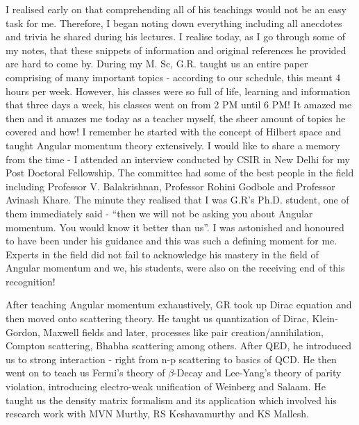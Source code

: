I realised early on that comprehending all of his teachings would not be an easy task
for me. Therefore, I began noting down everything including all anecdotes and trivia he
shared during his lectures. I realise today, as I go through some of my notes, that these
snippets of information and original references he provided are hard to come by.
During my M. Sc, G.R. taught us an entire paper comprising of many important topics
- according to our schedule, this meant 4 hours per week. However, his classes were so
full of life, learning and information that three days a week, his classes went on from 2
PM until 6 PM! It amazed me then and it amazes me today as a teacher myself, the
sheer amount of topics he covered and how! I remember he started with the concept of
Hilbert space and taught Angular momentum theory extensively. I would like to share
a memory from the time - I attended an interview conducted by CSIR in New Delhi for
my Post Doctoral Fellowship. The committee had some of the best people in the field
including Professor V. Balakrishnan, Professor Rohini Godbole and Professor Avinash
Khare. The minute they realised that I was G.R's Ph.D. student, one of them immediately said - “then we will not be asking you about Angular momentum. You would know
it better than us”. I was astonished and honoured to have been under his guidance and
this was such a defining moment for me. Experts in the field did not fail to acknowledge	
his mastery in the field of Angular momentum and we, his students, were also on the
receiving end of this recognition!


After teaching Angular momentum exhaustively, GR took up Dirac equation and then
moved onto scattering theory. He taught us quantization of Dirac, Klein-Gordon,
Maxwell fields and later, processes like pair creation/annihilation, Compton scattering,
Bhabha scattering among others. After QED, he introduced us to strong interaction -
right from n-p scattering to basics of QCD. He then went on to teach us Fermi's theory of
$\beta$-Decay and Lee-Yang's theory of parity violation, introducing electro-weak unification
of Weinberg and Salaam. He taught us the density matrix formalism and its application which involved his research work with MVN Murthy, RS Keshavamurthy and KS
Mallesh.


